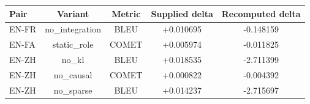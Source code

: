 \begingroup
\fontsize{7}{8.4}\selectfont
\setlength{\tabcolsep}{3pt}
\begin{tabular}{lcccc}
\toprule
\textbf{Pair} & \textbf{Variant} & \textbf{Metric} & \textbf{Supplied delta} & \textbf{Recomputed delta} \\
\midrule
EN-FR & no\_integration & BLEU & +0.010695 & -0.148159 \\
EN-FA & static\_role & COMET & +0.005974 & -0.011825 \\
EN-ZH & no\_kl & BLEU & +0.018535 & -2.711399 \\
EN-ZH & no\_causal & COMET & +0.000822 & -0.004392 \\
EN-ZH & no\_sparse & BLEU & +0.014237 & -2.715697 \\
\bottomrule
\end{tabular}
\endgroup
